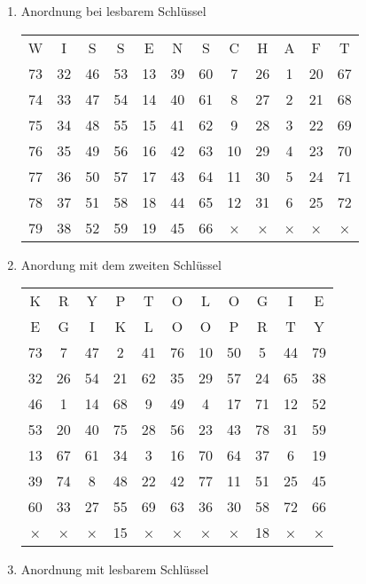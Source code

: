 \begin{enumerate}
     \item Anordnung bei lesbarem Schlüssel\\

\begin{center}
\begin{tabular}{cccccccccccc}
W & I & S & S & E & N & S & C & H & A & F & T\\
73 & 32 & 46 & 53 & 13 & 39 & 60 & 7 & 26 & 1 & 20 & 67\\
74 & 33 & 47 & 54 & 14 & 40 & 61 & 8 & 27 & 2 & 21 & 68\\
75 & 34 & 48 & 55 & 15 & 41 & 62 & 9 & 28 & 3 & 22 & 69\\
76 & 35 & 49 & 56 & 16 & 42 & 63 & 10 & 29 & 4 & 23 & 70\\
77 & 36 & 50 & 57 & 17 & 43 & 64 & 11 & 30 & 5 & 24 & 71\\
78 & 37 & 51 & 58 & 18 & 44 & 65 & 12 & 31 & 6 & 25 & 72\\
79 & 38 & 52 & 59 & 19 & 45 & 66 & × & × & × & × & ×
\end{tabular}
\end{center}

     \item Anordung mit dem zweiten Schlüssel\\

\begin{center}
\begin{tabular}{ccccccccccc}
K & R & Y & P & T & O & L & O & G & I & E\\
E & G & I & K & L & O & O & P & R & T & Y\\
73 & 7 & 47 & 2 & 41 & 76 & 10 & 50 & 5 & 44 & 79\\
32 & 26 & 54 & 21 & 62 & 35 & 29 & 57 & 24 & 65 & 38\\
46 & 1 & 14 & 68 & 9 & 49 & 4 & 17 & 71 & 12 & 52\\
53 & 20 & 40 & 75 & 28 & 56 & 23 & 43 & 78 & 31 & 59\\
13 & 67 & 61 & 34 & 3 & 16 & 70 & 64 & 37 & 6 & 19\\
39 & 74 & 8 & 48 & 22 & 42 & 77 & 11 & 51 & 25 & 45\\
60 & 33 & 27 & 55 & 69 & 63 & 36 & 30 & 58 & 72 & 66\\
× & × & × & 15 & × & × & × & × & 18 & × & ×
\end{tabular}
\end{center}

     \item Anordnung mit lesbarem Schlüssel\\


\end{enumerate}
